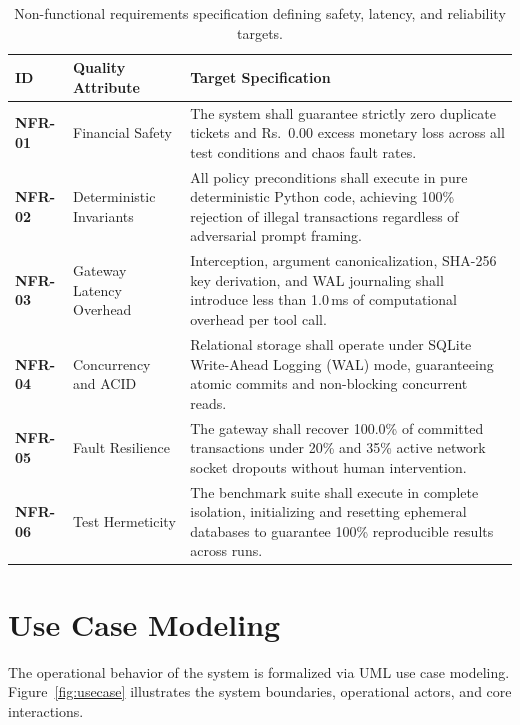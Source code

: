 \begin{table}[H]
\centering
\small
\renewcommand{\arraystretch}{1.25}
\begin{tabular}{|p{1.4cm}|p{3.2cm}|p{8.7cm}|}
\hline
\rowcolor{gray!15}
\textbf{ID} & \textbf{Quality Attribute} & \textbf{Target Specification} \\
\hline
\textbf{NFR-01} & Financial Safety & The system shall guarantee strictly zero duplicate tickets and Rs.~0.00 excess monetary loss across all test conditions and chaos fault rates. \\
\hline
\textbf{NFR-02} & Deterministic Invariants & All policy preconditions shall execute in pure deterministic Python code, achieving 100\% rejection of illegal transactions regardless of adversarial prompt framing. \\
\hline
\textbf{NFR-03} & Gateway Latency Overhead & Interception, argument canonicalization, SHA-256 key derivation, and WAL journaling shall introduce less than 1.0\,ms of computational overhead per tool call. \\
\hline
\textbf{NFR-04} & Concurrency and ACID & Relational storage shall operate under SQLite Write-Ahead Logging (WAL) mode, guaranteeing atomic commits and non-blocking concurrent reads. \\
\hline
\textbf{NFR-05} & Fault Resilience & The gateway shall recover 100.0\% of committed transactions under 20\% and 35\% active network socket dropouts without human intervention. \\
\hline
\textbf{NFR-06} & Test Hermeticity & The benchmark suite shall execute in complete isolation, initializing and resetting ephemeral databases to guarantee 100\% reproducible results across runs. \\
\hline
\end{tabular}
\caption{Non-functional requirements specification defining safety, latency, and reliability targets.}
\label{tab:nfr}
\end{table}

\section{Use Case Modeling}

The operational behavior of the system is formalized via UML use case modeling. Figure~\ref{fig:usecase} illustrates the system boundaries, operational actors, and core interactions.

